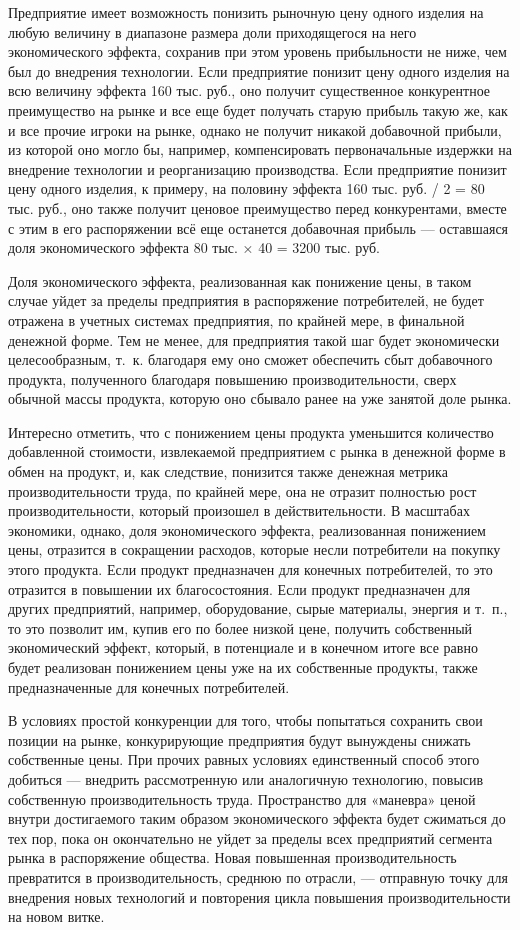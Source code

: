 \documentclass{article}
\begin{document}
Предприятие имеет возможность понизить рыночную цену одного изделия на любую величину в диапазоне размера доли приходящегося на него экономического эффекта, сохранив при этом уровень прибыльности не ниже, чем был до внедрения технологии. Если предприятие понизит цену одного изделия на всю величину эффекта 160 тыс. руб., оно получит существенное конкурентное преимущество на рынке и все еще будет получать старую прибыль такую же, как и все прочие игроки на рынке, однако не получит никакой добавочной прибыли, из которой оно могло бы, например, компенсировать первоначальные издержки на внедрение технологии и реорганизацию производства. Если предприятие понизит цену одного изделия, к примеру, на половину эффекта 160 тыс. руб. / 2 = 80 тыс. руб., оно также получит ценовое преимущество перед конкурентами, вместе с этим в его распоряжении всё еще останется добавочная прибыль — оставшаяся доля экономического эффекта 80 тыс. × 40 = 3200 тыс. руб.

Доля экономического эффекта, реализованная как понижение цены, в таком случае уйдет за пределы предприятия в распоряжение потребителей, не будет отражена в учетных системах предприятия, по крайней мере, в финальной денежной форме. Тем не менее, для предприятия такой шаг будет экономически целесообразным, т.~к. благодаря ему оно сможет обеспечить сбыт добавочного продукта, полученного благодаря повышению производительности, сверх обычной массы продукта, которую оно сбывало ранее на уже занятой доле рынка.

Интересно отметить, что с понижением цены продукта уменьшится количество добавленной стоимости, извлекаемой предприятием с рынка в денежной форме в обмен на продукт, и, как следствие, понизится также денежная метрика производительности труда, по крайней мере, она не отразит полностью рост производительности, который произошел в действительности. В масштабах экономики, однако, доля экономического эффекта, реализованная понижением цены, отразится в сокращении расходов, которые несли потребители на покупку этого продукта. Если продукт предназначен для конечных потребителей, то это отразится в повышении их благосостояния. Если продукт предназначен для других предприятий, например, оборудование, сырые материалы, энергия и т.~п., то это позволит им, купив его по более низкой цене, получить собственный экономический эффект, который, в потенциале и в конечном итоге все равно будет реализован понижением цены уже на их собственные продукты, также предназначенные для конечных потребителей.

В условиях простой конкуренции для того, чтобы попытаться сохранить свои позиции на рынке, конкурирующие предприятия будут вынуждены снижать собственные цены. При прочих равных условиях единственный способ этого добиться — внедрить рассмотренную или аналогичную технологию, повысив собственную производительность труда. Пространство для «маневра» ценой внутри достигаемого таким образом экономического эффекта будет сжиматься до тех пор, пока он окончательно не уйдет за пределы всех предприятий сегмента рынка в распоряжение общества. Новая повышенная производительность превратится в производительность, среднюю по отрасли, — отправную точку для внедрения новых технологий и повторения цикла повышения производительности на новом витке.
\end{document}
